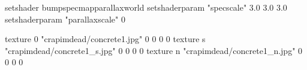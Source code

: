 setshader bumpspecmapparallaxworld
setshaderparam "specscale" 3.0 3.0 3.0
setshaderparam "parallaxscale" 0

texture 0 "crapimdead/concrete1.jpg" 0 0 0 0
texture s "crapimdead/concrete1_s.jpg" 0 0 0 0
texture n "crapimdead/concrete1_n.jpg" 0 0 0 0
